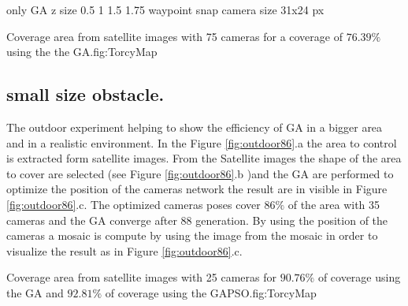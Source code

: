 only GA 
z size  0.5 1 1.5 1.75
waypoint snap
camera size 31x24 px
\begin{mfigures}[!]
{Coverage area from satellite images with 75 cameras for a coverage of $76.39\%$ using the the GA.}{fig:TorcyMap} \centering
{}
\hspace{1cm}
\hspace{1cm}
\tabsimupose
\end{mfigures}	

	
	\subsection{small size  obstacle.}

The outdoor experiment helping to show the efficiency of GA in a bigger area and in a realistic environment. In the Figure \ref{fig:outdoor86}.a the area to control is extracted form satellite images. From the Satellite images the shape of the area to cover are selected (see Figure \ref{fig:outdoor86}.b )and the GA are performed to optimize the position of the cameras network the result are in visible in Figure \ref{fig:outdoor86}.c. 
The optimized cameras poses cover $86\%$ of the area with 35 cameras and the GA converge after 88 generation.
By using the position of the cameras a mosaic is compute by using the image from the mosaic in order to visualize the result as in Figure \ref{fig:outdoor86}.c.


\begin{mfigures}[!]
{Coverage area from satellite images with 25 cameras for $90.76\%$ of coverage using the GA and $92.81\%$ of coverage using the GAPSO.}{fig:TorcyMap} \centering
{}
\hspace{1cm}
\hspace{1cm}
\tabsimupose
\end{mfigures}


